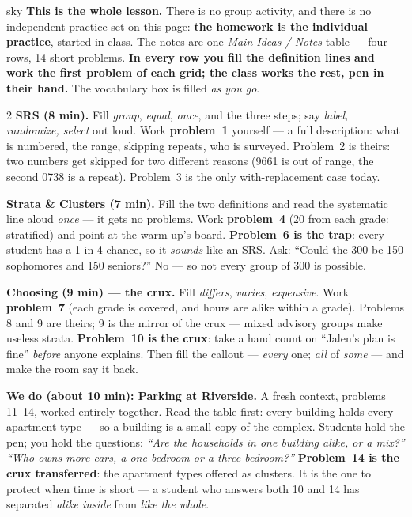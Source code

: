 \documentclass[10pt]{article}
\begin{document}
\boxguard
\begin{skillbox}{sky}
\textbf{This is the whole lesson.} There is no group activity, and there is no independent
practice set on this page: \textbf{the homework is the individual practice}, started in class.
The notes are one \emph{Main Ideas / Notes} table --- four rows, 14 short problems.
\textbf{In every row you fill the definition lines and work the first problem of each grid; the
class works the rest, pen in their hand.} The vocabulary box is filled \emph{as you go}.
\begin{multicols}{2}
\textbf{SRS (8 min).} Fill \emph{group}, \emph{equal}, \emph{once}, and the three steps; say
\emph{label, randomize, select} out loud. Work \textbf{problem~1} yourself --- a full
description: what is numbered, the range, skipping repeats, who is surveyed. Problem~2 is
theirs: two numbers get skipped for two different reasons (9661 is out of range, the second
0738 is a repeat). Problem~3 is the only with-replacement case today.

\textbf{Strata \& Clusters (7 min).} Fill the two definitions and read the systematic line
aloud \emph{once} --- it gets no problems. Work \textbf{problem~4} (20 from each grade:
stratified) and point at the warm-up's board. \textbf{Problem~6 is the trap}: every student
has a 1-in-4 chance, so it \emph{sounds} like an SRS. Ask: ``Could the 300 be 150 sophomores
and 150 seniors?'' No --- so not every group of 300 is possible.

\textbf{Choosing (9 min) --- the crux.} Fill \emph{differs}, \emph{varies}, \emph{expensive}.
Work \textbf{problem~7} (each grade is covered, and hours are alike within a grade).
Problems 8 and 9 are theirs; 9 is the mirror of the crux --- mixed advisory groups make
useless strata. \textbf{Problem~10 is the crux}: take a hand count on ``Jalen's plan is fine''
\emph{before} anyone explains. Then fill the callout --- \emph{every} one; \emph{all} of
\emph{some} --- and make the room say it back.

\columnbreak
\textbf{We do (about 10 min): Parking at Riverside.} A fresh context, problems 11--14, worked
entirely together. Read the table first: every building holds every apartment type --- so a
building is a small copy of the complex. Students hold the pen; you hold the questions:
\emph{``Are the households in one building alike, or a mix?''} \quad \emph{``Who owns more
cars, a one-bedroom or a three-bedroom?''} \textbf{Problem~14 is the crux transferred}: the
apartment types offered as clusters. It is the one to protect when time is short --- a student
who answers both 10 and 14 has separated \emph{alike inside} from \emph{like the whole}.


\end{multicols}
\end{skillbox}
\end{document}
